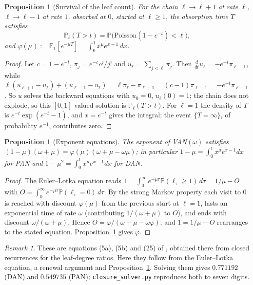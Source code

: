 \documentclass[11pt]{article}
\theoremstyle{plain}
\newtheorem{proposition}[theorem]{Proposition}
\theoremstyle{definition}
\theoremstyle{remark}
\newtheorem{remark}[theorem]{Remark}
\begin{document}
\begin{proposition}[Survival of the leaf count]\label{c:prop:poisson}
For the chain $\ell\to\ell+1$ at rate $\ell$, $\ell\to\ell-1$ at rate $1$, absorbed at $0$, started at $\ell\ge1$, the absorption time $T$ satisfies
\[
\mathbb{P}_\ell(T>t)=\mathbb{P}\bigl(\mathrm{Poisson}(1-e^{-t})<\ell\bigr),
\]
and $\varphi(\mu):=\mathbb{E}_1[e^{-\mu T}]=\int_0^1x^{\mu}e^{x-1}\,dx$.
\end{proposition}

\begin{proof}
Let $c=1-e^{-t}$, $\pi_j=e^{-c}c^j/j!$ and $u_\ell=\sum_{j<\ell}\pi_j$. Then $\frac{d}{dt}u_\ell=-e^{-t}\pi_{\ell-1}$, while $\ell(u_{\ell+1}-u_\ell)+(u_{\ell-1}-u_\ell)=\ell\pi_\ell-\pi_{\ell-1}=(c-1)\pi_{\ell-1}=-e^{-t}\pi_{\ell-1}$. So $u$ solves the backward equations with $u_0=0$, $u_\ell(0)=1$; the chain does not explode, so this $[0,1]$-valued solution is $\mathbb{P}_\ell(T>t)$. For $\ell=1$ the density of $T$ is $e^{-t}\exp(e^{-t}-1)$, and $x=e^{-t}$ gives the integral; the event $\{T=\infty\}$, of probability $e^{-1}$, contributes zero.
\end{proof}

\begin{proposition}[Exponent equations]\label{c:prop:van}
The exponent of VAN$(\omega)$ satisfies $(1-\mu)(\omega+\mu)=\varphi(\mu)(\omega+\mu-\omega\mu)$; in particular $1-\mu=\int_0^1x^\mu e^{x-1}dx$ for PAN and $1-\mu^2=\int_0^1x^\mu e^{x-1}dx$ for DAN.
\end{proposition}

\begin{proof}
The Euler--Lotka equation reads $1=\int_0^\infty e^{-\mu\tau}\mathbb{P}(\ell_\tau\ge1)\,d\tau=1/\mu-O$ with $O=\int_0^\infty e^{-\mu\tau}\mathbb{P}(\ell_\tau=0)\,d\tau$. By the strong Markov property each visit to $0$ is reached with discount $\varphi(\mu)$ from the previous start at $\ell=1$, lasts an exponential time of rate $\omega$ (contributing $1/(\omega+\mu)$ to $O$), and ends with discount $\omega/(\omega+\mu)$. Hence $O=\varphi/(\omega+\mu-\omega\varphi)$, and $1=1/\mu-O$ rearranges to the stated equation. Proposition~\ref{c:prop:poisson} gives $\varphi$.
\end{proof}

\begin{remark}
These are equations (5a), (5b) and (25) of \cite{HKRZ2026}, obtained there from closed recurrences for the leaf-degree ratios. Here they follow from the Euler--Lotka equation, a renewal argument and Proposition~\ref{c:prop:poisson}. Solving them gives $0.771192$ (DAN) and $0.549735$ (PAN); \texttt{closure\_solver.py} reproduces both to seven digits.
\end{remark}
\end{document}
